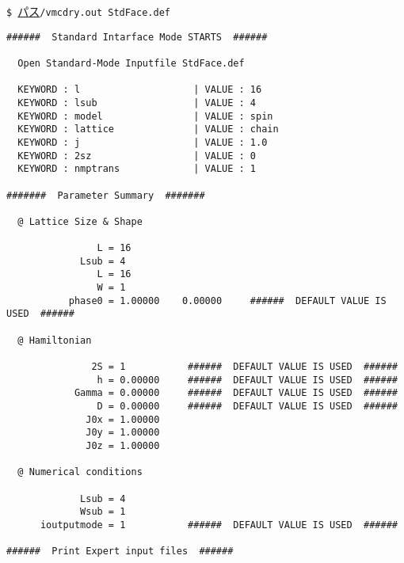 \vspace{1cm}\hspace{-0.7cm}
\verb|$ |\underline{パス}\verb|/vmcdry.out StdFace.def|
\small
\begin{verbatim}
######  Standard Intarface Mode STARTS  ######

  Open Standard-Mode Inputfile StdFace.def

  KEYWORD : l                    | VALUE : 16
  KEYWORD : lsub                 | VALUE : 4
  KEYWORD : model                | VALUE : spin
  KEYWORD : lattice              | VALUE : chain
  KEYWORD : j                    | VALUE : 1.0
  KEYWORD : 2sz                  | VALUE : 0
  KEYWORD : nmptrans             | VALUE : 1

#######  Parameter Summary  #######

  @ Lattice Size & Shape

                L = 16
             Lsub = 4
                L = 16
                W = 1
           phase0 = 1.00000    0.00000     ######  DEFAULT VALUE IS USED  ######

  @ Hamiltonian

               2S = 1           ######  DEFAULT VALUE IS USED  ######
                h = 0.00000     ######  DEFAULT VALUE IS USED  ######
            Gamma = 0.00000     ######  DEFAULT VALUE IS USED  ######
                D = 0.00000     ######  DEFAULT VALUE IS USED  ######
              J0x = 1.00000
              J0y = 1.00000
              J0z = 1.00000

  @ Numerical conditions

             Lsub = 4
             Wsub = 1
      ioutputmode = 1           ######  DEFAULT VALUE IS USED  ######

######  Print Expert input files  ######


\end{verbatim}
